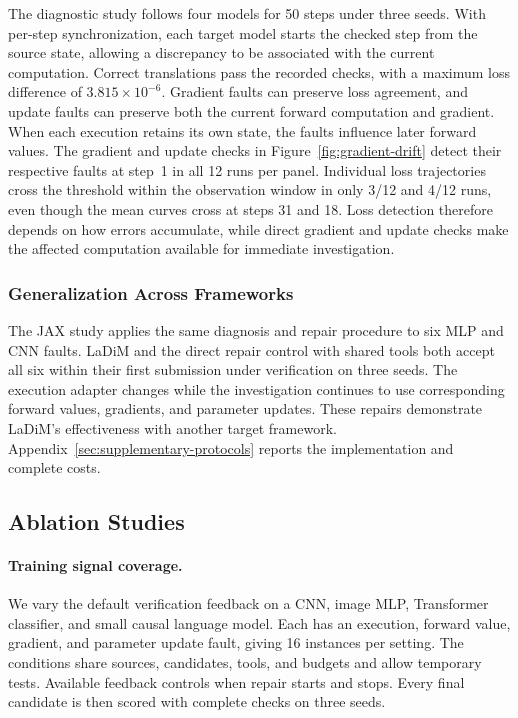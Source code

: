 \documentclass{article}
\begin{document}
The diagnostic study follows four models for 50 steps under three seeds. With per-step synchronization, each target model starts the checked step from the source state, allowing a discrepancy to be associated with the current computation. Correct translations pass the recorded checks, with a maximum loss difference of $3.815\times10^{-6}$. Gradient faults can preserve loss agreement, and update faults can preserve both the current forward computation and gradient. When each execution retains its own state, the faults influence later forward values. The gradient and update checks in Figure~\ref{fig:gradient-drift} detect their respective faults at step~1 in all 12 runs per panel. Individual loss trajectories cross the threshold within the observation window in only 3/12 and 4/12 runs, even though the mean curves cross at steps 31 and 18. Loss detection therefore depends on how errors accumulate, while direct gradient and update checks make the affected computation available for immediate investigation.

\subsubsection{Generalization Across Frameworks}
\label{sec:generalization}

The JAX study applies the same diagnosis and repair procedure to six MLP and CNN faults. LaDiM and the direct repair control with shared tools both accept all six within their first submission under verification on three seeds. The execution adapter changes while the investigation continues to use corresponding forward values, gradients, and parameter updates. These repairs demonstrate LaDiM's effectiveness with another target framework. Appendix~\ref{sec:supplementary-protocols} reports the implementation and complete costs.

\subsection{Ablation Studies}
\label{sec:ablations}

\paragraph{Training signal coverage.}
We vary the default verification feedback on a CNN, image MLP, Transformer classifier, and small causal language model. Each has an execution, forward value, gradient, and parameter update fault, giving 16 instances per setting. The conditions share sources, candidates, tools, and budgets and allow temporary tests. Available feedback controls when repair starts and stops. Every final candidate is then scored with complete checks on three seeds.
\end{document}
